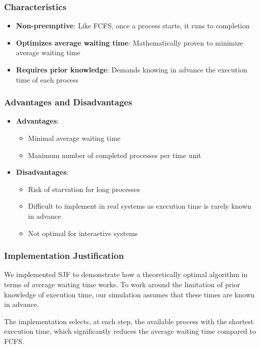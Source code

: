 \documentclass[12pt,a4paper]{article}
\begin{document}
\subsubsection{Characteristics}
\begin{itemize}
    \item \textbf{Non-preemptive}: Like FCFS, once a process starts, it runs to completion
    \item \textbf{Optimizes average waiting time}: Mathematically proven to minimize average waiting time
    \item \textbf{Requires prior knowledge}: Demands knowing in advance the execution time of each process
\end{itemize}

\subsubsection{Advantages and Disadvantages}
\begin{itemize}
    \item \textbf{Advantages}:
    \begin{itemize}
        \item Minimal average waiting time
        \item Maximum number of completed processes per time unit
    \end{itemize}
    \item \textbf{Disadvantages}:
    \begin{itemize}
        \item Risk of starvation for long processes
        \item Difficult to implement in real systems as execution time is rarely known in advance
        \item Not optimal for interactive systems
    \end{itemize}
\end{itemize}

\subsubsection{Implementation Justification}
We implemented SJF to demonstrate how a theoretically optimal algorithm in terms of average waiting time works. To work around the limitation of prior knowledge of execution time, our simulation assumes that these times are known in advance.

The implementation selects, at each step, the available process with the shortest execution time, which significantly reduces the average waiting time compared to FCFS.
\end{document}
